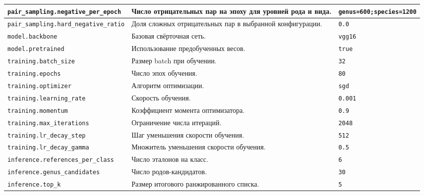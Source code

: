 \begin{table}[!htbp]
\begin{tabularx}{\linewidth}{|p{4.5cm}|X|p{4.6cm}|}
		\hline
		\texttt{pair\_sampling.}\newline\texttt{negative\_per\_epoch} & Число отрицательных пар на эпоху для уровней рода и вида. & \texttt{genus=600;}\newline\texttt{species=1200} \\
		\hline
		\texttt{pair\_sampling.}\newline\texttt{hard\_negative\_ratio} & Доля сложных отрицательных пар в выбранной конфигурации. & \texttt{0.0} \\
		\hline
		\texttt{model.backbone} & Базовая свёрточная сеть. & \texttt{vgg16} \\
		\hline
		\texttt{model.pretrained} & Использование предобученных весов. & \texttt{true} \\
		\hline
		\texttt{training.}\newline\texttt{batch\_size} & Размер batch при обучении. & \texttt{32} \\
		\hline
		\texttt{training.epochs} & Число эпох обучения. & \texttt{80} \\
		\hline
		\texttt{training.}\newline\texttt{optimizer} & Алгоритм оптимизации. & \texttt{sgd} \\
		\hline
		\texttt{training.}\newline\texttt{learning\_rate} & Скорость обучения. & \texttt{0.001} \\
		\hline
		\texttt{training.momentum} & Коэффициент момента оптимизатора. & \texttt{0.9} \\
		\hline
		\texttt{training.}\newline\texttt{max\_iterations} & Ограничение числа итераций. & \texttt{2048} \\
		\hline
		\texttt{training.}\newline\texttt{lr\_decay\_step} & Шаг уменьшения скорости обучения. & \texttt{512} \\
		\hline
		\texttt{training.}\newline\texttt{lr\_decay\_gamma} & Множитель уменьшения скорости обучения. & \texttt{0.5} \\
		\hline
		\texttt{inference.}\newline\texttt{references\_per\_class} & Число эталонов на класс. & \texttt{6} \\
		\hline
		\texttt{inference.}\newline\texttt{genus\_candidates} & Число родов-кандидатов. & \texttt{30} \\
		\hline
		\texttt{inference.top\_k} & Размер итогового ранжированного списка. & \texttt{5} \\
		\hline
	\end{tabularx}
\end{table}
\FloatBarrier

